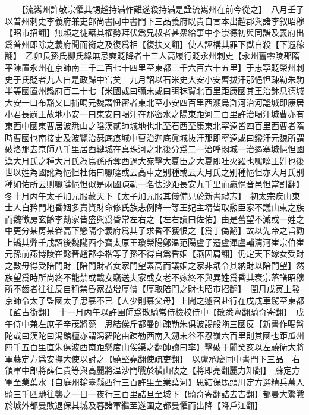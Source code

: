 　　【流嶲州許敬宗懼其甥趙持滿作難遂殺持滿是詮流嶲州在前今從之】　八月壬子以普州刺史李義府兼吏部尚書同中書門下三品義府既貴自言本出趙郡與諸李叙昭穆【昭市招翻】無賴之徒藉其權勢拜伏爲兄叔者甚衆給事中李崇德初與同譜及義府出爲普州即除之義府聞而銜之及復爲相【復扶又翻】使人誣構其罪下獄自殺【下遐稼翻】　乙卯長孫氏柳氏緣無忌奭貶降者十三人高履行貶永州刺史【永州舊零陵郡隋平陳置永州在京師南三千二百七十四里至東都三千六百六十五里】于志寜貶榮州刺史于氏貶者九人自是政歸中宫矣　九月詔以石米史大安小安曹拔汗那悒怛疎勒朱駒半等國置州縣府百二十七【米國或曰彌末或曰弭秣賀北百里距康國其王治鉢息德城大安一曰布豁又曰捕喝元魏謂忸密者東北至小安四百里西瀕烏滸河治河謐城即康居小君長罽王故地小安一曰東安曰喝汗在那密水之陽東距河二百里許治喝汗城曹亦有東西中國東曹居波悉山之陰漢貳師城地也北至石西至康東北寜遠皆四百里西曹者隋時曹國也南接史及波覽治瑟底痕城中曹治迦底眞城抜汗那即寧遠或曰鏺汗元魏所謂破洛那去京師八千里居西鞬城在真珠河之北後分爲二一治呼悶城一治遏塞城悒怛國漢大月氏之種大月氏為烏孫所奪西過大宛擊大夏臣之大夏即吐火羅也嚈噠王姓也後世以姓為國訛為悒怛杜佑曰嚈噠或云高車之别種或云大月氏之别種悒怛亦大月氏别種如佑所云則嚈噠悒怛似是兩國疎勒一名佉沙距長安九千里而贏悒音邑怛當割翻】　冬十月丙午太子加元服赦天下【太子加元服其儀備見於新書禮志】　初太宗疾山東士人自矜門地昏姻多責資財命修氏族志例降一等王妃主壻皆取勲臣家不議山東之族而魏徵房玄齡李勣家皆盛與爲昏常左右之【左右讀曰佐佑】由是舊望不減或一姓之中更分某房某眷高下懸隔李義府爲其子求昏不獲恨之【爲丁偽翻】故以先帝之旨勸上矯其弊壬戌詔後魏隴西李寶太原王瓊榮陽鄭温范陽盧子遷盧渾盧輔清河崔宗伯崔元孫前燕博陵崔懿晉趙郡李楷等子孫不得自爲昏姻【燕因肩翻】仍定天下嫁女受財之數毋得受陪門財【陪門財者女家門望素高而議姻之家非耦令其納財以陪門望】然族望爲時所尚終不能禁或載女竊送夫家或女老不嫁終不與異姓爲昏其衰宗落譜昭穆所不齒者往往反自稱禁昏家益增厚價【厚取陪門之財也昭市招翻】　閏月戊寅上發京師令太子監國太子思慕不已【人少則慕父母】上聞之遽召赴行在戊戌車駕至東都【監古銜翻】　十一月丙午以許圉師爲散騎常侍檢校侍中【散悉亶翻騎奇寄翻】　戊午侍中兼左庶子辛茂將薨　思結俟斤都曼帥疎勒朱俱波謁般陁三國反【新書作喝盤陀或曰漢陀曰渇館檀亦謂渇羅陀由疎勒西南入劒末谷不忍嶺六百里則其國也距瓜州四千五百里直朱俱波西南距懸度山俟渠之翻帥讀曰率】擊破于闐癸亥以左驍衛大將軍蘇定方爲安撫大使以討之【驍堅堯翻使疏吏翻】　以盧承慶同中書門下三品　右領軍中郎將薛仁貴等與高麗將温沙門戰於横山破之【將即亮翻麗力知翻】　蘇定方軍至業葉水【自庭州輪臺縣西行三百許里至業葉河】思結保馬頭川定方選精兵萬人騎三千匹馳往襲之一日一夜行三百里詰旦至城下【騎奇寄翻詰去吉翻】都曼大驚戰於城外都曼敗退保其城及暮諸軍繼至遂圍之都曼懼而出降【降戶江翻】

